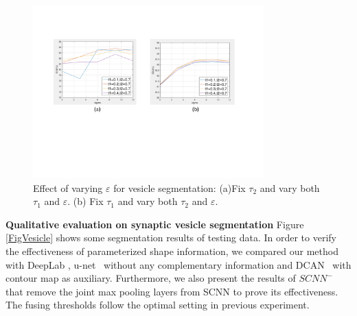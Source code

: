 \begin{figure}
    \begin{center}
        \includegraphics[width=3.5in]{figures/FigVar.pdf}
    \end{center}
    \caption{Effect of varying $\varepsilon$ for vesicle segmentation: (a)Fix $\tau_2$ and vary both $\tau_1$ and $\varepsilon$. (b) Fix $\tau_1$ and vary both $\tau_2$ and $\varepsilon$.}
    \label{FigVar}
\end{figure}

\noindent\textbf{Qualitative evaluation on synaptic vesicle segmentation}
Figure \ref{FigVesicle} shows some segmentation results of testing data.
In order to verify the effectiveness of parameterized shape information, we compared our method with DeepLab \cite{Chen2014a}, u-net~\cite{Ronneberger2015} without any complementary information and DCAN~\cite{Chen2016a} with contour map as auxiliary.
Furthermore, we also present the results of $SCNN^{-}$ that remove the joint max pooling layers from SCNN to prove its effectiveness.
The fusing thresholds follow the optimal setting in previous experiment.


